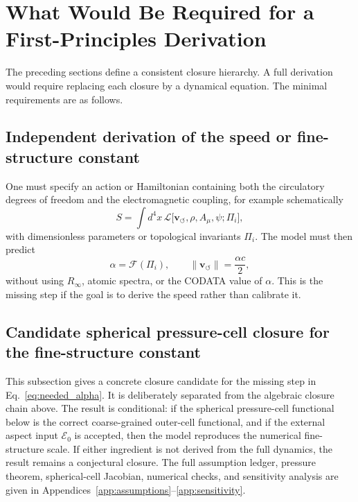 \documentclass[aps,pra,preprint,longbibliography,nofootinbib]{revtex4-2}
\newcommand{\vnorm}{\lVert\mathbf{v}_{\!\boldsymbol{\circlearrowleft}}\rVert} %
\newcommand{\Et}{\mathcal{E}_0}                    %
\begin{document}
\section{What Would Be Required for a First-Principles Derivation}
\label{sec:requirements}

The preceding sections define a consistent closure hierarchy.  A full
derivation would require replacing each closure by a dynamical equation.
The minimal requirements are as follows.

\subsection{Independent derivation of the speed or fine-structure constant}

One must specify an action or Hamiltonian containing both the
circulatory degrees of freedom and the electromagnetic coupling, for
example schematically
\begin{equation}
  S = \int d^4x\,\mathcal{L}\bigl[\mathbf{v}_{\!\boldsymbol{\circlearrowleft}},
  \rho, A_\mu, \psi;\Pi_i\bigr],
  \label{eq:needed_action}
\end{equation}
with dimensionless parameters or topological invariants $\Pi_i$.  The
model must then predict
\begin{equation}
  \alpha = \mathcal{F}(\Pi_i),
  \qquad
  \vnorm = \frac{\alpha c}{2},
  \label{eq:needed_alpha}
\end{equation}
without using $R_\infty$, atomic spectra, or the CODATA value of
$\alpha$.  This is the missing step if the goal is to derive the speed
rather than calibrate it.


\subsection{Candidate spherical pressure-cell closure for the fine-structure constant}
\label{sec:spherical_cell}

This subsection gives a concrete closure candidate for the missing step in
Eq.~\eqref{eq:needed_alpha}.  It is deliberately separated from the
algebraic closure chain above.  The result is conditional: if the spherical
pressure-cell functional below is the correct coarse-grained outer-cell
functional, and if the external aspect input $\Et$ is accepted, then the
model reproduces the numerical fine-structure scale.  If either ingredient
is not derived from the full dynamics, the result remains a conjectural
closure.  The full assumption ledger, pressure theorem, spherical-cell
Jacobian, numerical checks, and sensitivity analysis are given in
Appendices~\ref{app:assumptions}--\ref{app:sensitivity}.
\end{document}
